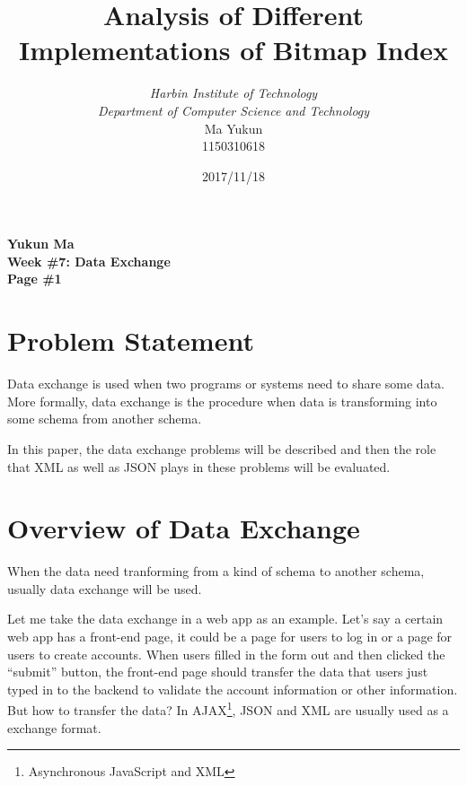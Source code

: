 \documentclass[12pt, a4paper]{article}
\begin{document}
\title{{\bf\Huge Analysis of Different Implementations of Bitmap Index}}
\author{\emph{Harbin Institute of Technology}\\\emph{Department of Computer Science and Technology}\\Ma Yukun\\1150310618}

\date{2017/11/18}

\nocite{*}


\begin{center}
{\textbf{
Yukun Ma\\
Week \#7: Data Exchange\\
Page \#1}}
\end{center}

\section{Problem Statement}

Data exchange is used when two programs or systems need to share some data. More formally, data exchange is the procedure when data is transforming into some schema from another schema.\cite{wiki}

In this paper, the data exchange problems will be described and then the role that XML as well as JSON plays in these problems will be evaluated.




\section{Overview of Data Exchange}

When the data need tranforming from a kind of schema to another schema, usually data exchange will be used.

Let me take the data exchange in a web app as an example. Let's say a certain web app has a front-end page, it could be a page for users to log in or a page for users to create accounts. When users filled in the form out and then clicked the ``submit'' button, the front-end page should transfer the data that users just typed in to the backend to validate the account information or other information. But how to transfer the data? In AJAX\footnote{Asynchronous JavaScript and XML}, JSON and XML are usually used as a exchange format.
\end{document}
